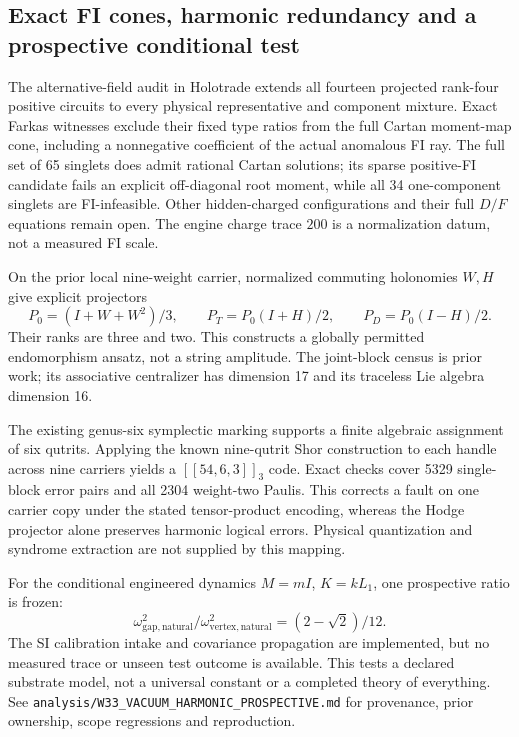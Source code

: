 \subsection*{Exact FI cones, harmonic redundancy and a prospective conditional test}
The alternative-field audit in Holotrade extends all fourteen projected rank-four
positive circuits to every physical representative and component mixture.
Exact Farkas witnesses exclude their fixed type ratios from the full Cartan
moment-map cone, including a nonnegative coefficient of the actual anomalous
FI ray. The full set of 65 singlets does admit rational Cartan solutions;
its sparse positive-FI candidate fails an explicit off-diagonal root moment,
while all 34 one-component singlets are FI-infeasible. Other hidden-charged
configurations and their full $D/F$ equations remain open.
The engine charge trace $200$ is a normalization datum, not a measured FI scale.

On the prior local nine-weight carrier, normalized commuting holonomies $W,H$
give explicit projectors
\[
 P_0=(I+W+W^2)/3,\qquad P_T=P_0(I+H)/2,\qquad P_D=P_0(I-H)/2.
\]
Their ranks are three and two. This constructs a globally permitted
endomorphism ansatz, not a string amplitude. The joint-block census is prior
work; its associative centralizer has dimension 17 and its traceless Lie
algebra dimension 16.

The existing genus-six symplectic marking supports a finite algebraic
assignment of six qutrits. Applying the known nine-qutrit Shor construction
to each handle across nine carriers yields a $[[54,6,3]]_3$ code. Exact
checks cover 5329 single-block error pairs and all 2304 weight-two Paulis.
This corrects a fault on one carrier copy under the stated tensor-product
encoding, whereas the Hodge projector alone preserves harmonic logical errors.
Physical quantization and syndrome extraction are not supplied by this mapping.

For the conditional engineered dynamics $M=mI$, $K=kL_1$, one prospective
ratio is frozen:
\[
 \omega_{\mathrm{gap,natural}}^2/\omega_{\mathrm{vertex,natural}}^2
 = (2-\sqrt{2})/12.
\]
The SI calibration intake and covariance propagation are implemented, but no
measured trace or unseen test outcome is available. This tests a declared
substrate model, not a universal constant or a completed theory of everything.
See \texttt{analysis/W33\_VACUUM\_HARMONIC\_PROSPECTIVE.md} for provenance,
prior ownership, scope regressions and reproduction.
